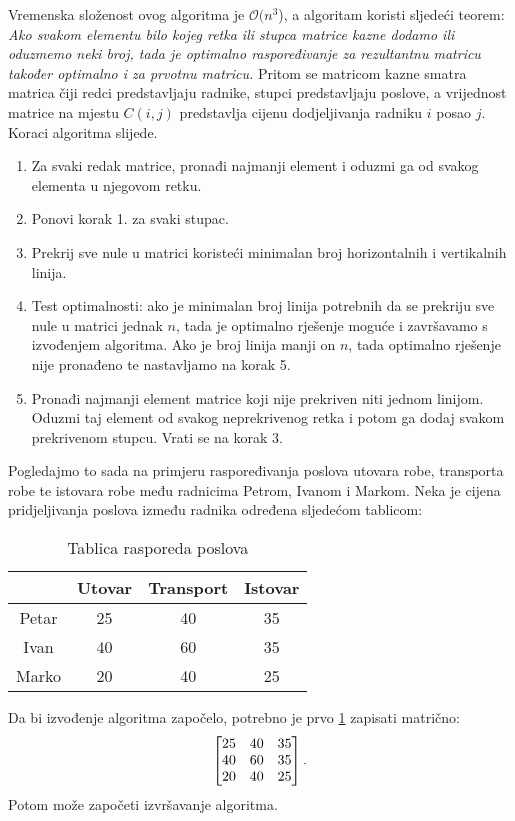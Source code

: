 \documentclass[times, utf8, zavrsni]{fer}
\begin{document}
Vremenska složenost ovog algoritma je $\mathcal{O}(n^3$), a algoritam koristi sljedeći teorem:
\emph{Ako svakom elementu bilo kojeg retka ili stupca matrice kazne dodamo ili oduzmemo neki broj, tada je optimalno raspoređivanje za rezultantnu matricu također optimalno i za prvotnu matricu.} Pritom se matricom kazne smatra matrica čiji redci predstavljaju radnike, stupci predstavljaju poslove, a vrijednost matrice na mjestu $C(i, j)$ predstavlja cijenu dodjeljivanja radniku $i$ posao $j$.
Koraci algoritma slijede.
\begin{enumerate}
  \item Za svaki redak matrice, pronađi najmanji element i oduzmi ga od svakog elementa u njegovom retku.
  \item Ponovi korak 1. za svaki stupac.
  \item Prekrij sve nule u matrici koristeći minimalan broj horizontalnih i vertikalnih linija.
  \item Test optimalnosti: ako je minimalan broj linija potrebnih da se prekriju sve nule u matrici jednak $n$, tada je optimalno rješenje moguće
  i završavamo s izvođenjem algoritma. Ako je broj linija manji on $n$, tada optimalno rješenje nije pronađeno te nastavljamo na korak 5.
  \item Pronađi najmanji element matrice koji nije prekriven niti jednom linijom. Oduzmi taj element od svakog neprekrivenog
  retka i potom ga dodaj svakom prekrivenom stupcu. Vrati se na korak 3.
\end{enumerate}


Pogledajmo to sada na primjeru raspoređivanja poslova utovara robe, transporta robe te istovara robe među radnicima Petrom, Ivanom i Markom.
Neka je cijena pridjeljivanja poslova između radnika određena sljedećom tablicom:
\begin{table}[h!]
  \caption{Tablica rasporeda poslova}
  \label{tbl:poslovi}
  \centering
  \begin{tabular}{c | c | c | c}
          & Utovar & Transport & Istovar \\ \hline
    Petar & 25     & 40        & 35      \\ \hline
    Ivan  & 40     & 60        & 35      \\ \hline
    Marko & 20     & 40        & 25
  \end{tabular}
\end{table}

\noindent Da bi izvođenje algoritma započelo, potrebno je prvo \ref{tbl:poslovi} zapisati matrično:
$$
\begin{bmatrix}
  \centering
  25 & 40 & 35 \\
  40 & 60 & 35 \\
  20 & 40 & 25
\end{bmatrix}.
$$
Potom može započeti izvršavanje algoritma.
\end{document}
